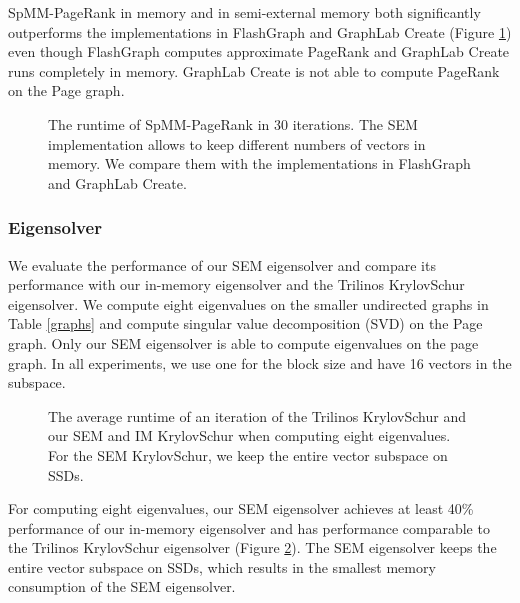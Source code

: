 SpMM-PageRank in memory and in semi-external memory both significantly outperforms
the implementations in FlashGraph and GraphLab Create (Figure \ref{perf:pagerank})
even though FlashGraph computes approximate PageRank and GraphLab Create runs
completely in memory. GraphLab Create is not able to compute PageRank on the Page
graph.


\begin{figure}
	\begin{center}
		\footnotesize
		
		\caption{The runtime of SpMM-PageRank in 30 iterations. The SEM
			implementation allows to keep different numbers of vectors in memory.
			We compare them with the implementations in FlashGraph and GraphLab
		Create.}
		\label{perf:pagerank}
	\end{center}
\end{figure}

\subsubsection{Eigensolver}

We evaluate the performance of our SEM eigensolver and compare its performance
with our in-memory eigensolver and the Trilinos KrylovSchur eigensolver.
We compute eight eigenvalues on the smaller undirected graphs
in Table \ref{graphs} and compute singular value decomposition (SVD) on
the Page graph. Only our SEM eigensolver is able to compute eigenvalues
on the page graph. In all experiments, we use one for the block size and
have 16 vectors in the subspace.

\begin{figure}
	\begin{center}
		\footnotesize
		
		\caption{The average runtime of an iteration of the Trilinos KrylovSchur
			and our SEM and IM KrylovSchur when computing eight eigenvalues.
			For the SEM KrylovSchur, we keep the entire vector subspace on SSDs.}
		\label{fig:eigen}
	\end{center}
\end{figure}

For computing eight eigenvalues, our SEM eigensolver achieves at least 40\%
performance of our in-memory eigensolver and has performance comparable to
the Trilinos KrylovSchur eigensolver (Figure \ref{fig:eigen}). The SEM
eigensolver keeps the entire vector subspace on SSDs, which results in
the smallest memory consumption of the SEM eigensolver.

